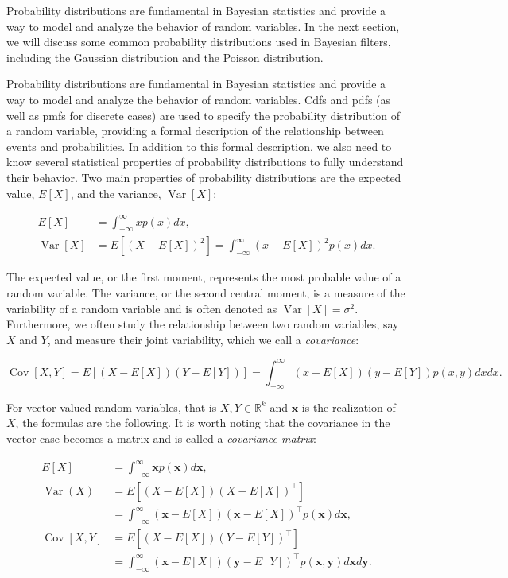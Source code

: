 Probability distributions are fundamental in Bayesian statistics and provide a way
to model and analyze the behavior of random variables. In the next section,
we will discuss some common probability distributions used in Bayesian filters,
including the Gaussian distribution and the Poisson distribution.

Probability distributions are fundamental in Bayesian statistics and provide a way
to model and analyze the behavior of random variables. Cdfs and pdfs (as well as pmfs
for discrete cases) are used to specify the probability distribution of a random
variable, providing a formal description of the relationship
between events and probabilities. In addition to this formal description, we also
need to know several statistical properties of probability distributions to fully
understand their behavior. Two main properties of probability distributions are
the expected value, $E[X]$, and the variance, $\operatorname{Var}[X]$:

\begin{align}
E[X]&=\int_{-\infty}^{\infty} x p(x) d x, \\
\operatorname{Var}[X]
    &= E\left[(X-E[X])^2\right]
    =\int_{-\infty}^{\infty}(x-E[X])^2 p(x) d x.
\end{align}

The expected value, or the first moment, represents the most probable value of
a random variable. The variance, or the second central moment, is a measure of the
variability of a random variable and is often denoted as $\operatorname{Var}[X] = \sigma^2$.
Furthermore, we often study the relationship between two random variables, say $X$ and
$Y$, and measure their joint variability, which we call a \textit{covariance}:

\begin{equation}
\operatorname{Cov}[X, Y]
    = E\left[(X-E[X])(Y-E[Y])\right]
    =\int_{-\infty}^{\infty}(x-E[X])(y-E[Y]) p(x, y) d x d x.
\end{equation}

For vector-valued random variables, that is $X, Y \in \mathbb{R}^k$ and $\mathbf{x}$
is the realization of $X$, the formulas are the following. It is worth noting that
the covariance in the vector case becomes a matrix and is called a \textit{covariance
matrix}:

\begin{align}
E[X]
    &=\int_{-\infty}^{\infty} \mathbf{x} p(\mathbf{x}) d \mathbf{x}, \\
\operatorname{Var}(X)
    &= E\left[\left(X-E[X]\right)\left(X-E[X]\right)^\intercal\right]
    \\&=\int_{-\infty}^{\infty}
        \left(\mathbf{x}-E[X]\right)
        \left(\mathbf{x}-E[X]\right)^\intercal
        p(\mathbf{x})
        d \mathbf{x}, \\
\operatorname{Cov}[X, Y]
    &= E\left[\left(X-E[X]\right)\left(Y-E[Y]\right)^\intercal\right]
    \\&=\int_{-\infty}^{\infty}
        \left(\mathbf{x}-E[X]\right)
        \left(\mathbf{y}-E[Y]\right)^\intercal
        p(\mathbf{x}, \mathbf{y})
        d \mathbf{x} d \mathbf{y}.
\end{align}


